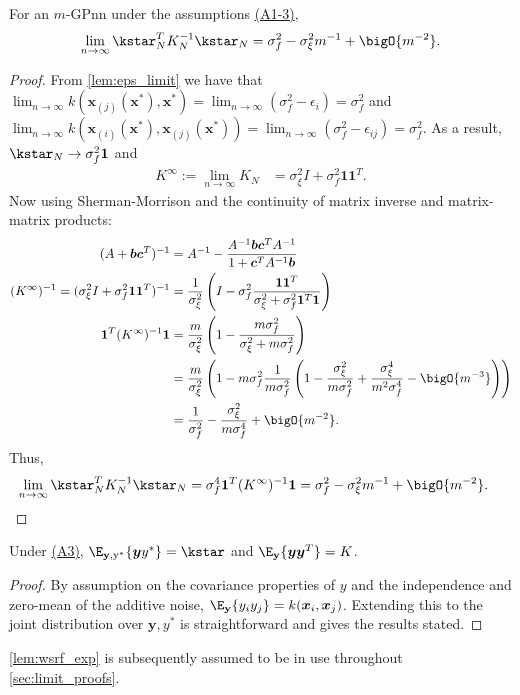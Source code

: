 \begin{lemma}
    \label{lem:gpnn_limit}
    For an \(m\)-GPnn under the assumptions \hyperref[{desc:assumptions_gpnn}]{(A1-3)},
    \[\lim_{n\rightarrow\infty} \kstar_N^TK_N^{-1}\kstar_N = \sigma_f^2-\sigma_\xi^2m^{-1} + \bigO{m^{-2}}.\]
\end{lemma}
\begin{proof}
    From \autoref{lem:eps_limit} we have that 
    \(\lim_{n\rightarrow\infty}k(\mathbf{x}_{(j)}(\bm{x}^*),\bm{x}^*) =
    \lim_{n\rightarrow\infty} (\sigma_f^2 - \epsilon_i) = \sigma_f^2\) and \(\lim_{n\rightarrow\infty} k(\mathbf{x}_{(i)}(\bm{x}^*), \mathbf{x}_{(j)}(\bm{x}^*)) = \lim_{n\rightarrow\infty}(\sigma_f^2 - \epsilon_{ij}) = \sigma_f^2\). 
    As a result, \(\kstar_N\rightarrow \sigma_f^2 \bm{1}\) and 
\begin{align}
    K^\infty:= \lim_{n\rightarrow\infty}K_N & = \sigma_\xi^2 I + \sigma_f^2\bm{11}^T.
\end{align}
Now using Sherman-Morrison and the continuity of matrix inverse and matrix-matrix products:
\begin{align}
    (A + \bm{bc}^T)^{-1} &= A^{-1} - \frac{A^{-1}\bm{bc}^TA^{-1}}{1+\bm{c}^TA^{-1}\bm{b}} \label{eq:sherman-morrison}\\
    (K^\infty)^{-1} = (\sigma_\xi^2I + \sigma_f^2 \bm{11}^T)^{-1} &= \frac{1}{\sigma_\xi^2}\left(I -
    \sigma_f^2\frac{\bm{11}^T}{\sigma_\xi^2 + \sigma_f^2\bm{1}^T\bm{1}}\right) \label{eq:lim_Kinv}\\
    \bm{1}^T(K^\infty)^{-1}\bm{1} &= \frac{m}{\sigma_\xi^2}\left(1 -
    \frac{m\sigma_f^2}{\sigma_\xi^2 + m\sigma_f^2}\right) \nonumber\\
    &= \frac{m}{\sigma_\xi^2}\left(1-m\sigma_f^2\frac{1}{m\sigma_f^2}\left(1-\frac{\sigma_\xi^2}{m\sigma_f^2}
    +\frac{\sigma_\xi^4}{m^2\sigma_f^4}-\bigO{m^{-3}}\right)\right) \nonumber\\
    &= \frac{1}{\sigma_f^2} -\frac{\sigma_\xi^2}{m\sigma_f^4} + \bigO{m^{-2}} \label{eq:Kinf_sum}. 
\end{align}
Thus,
\begin{align}
    \lim_{n\rightarrow\infty}\kstar_N^TK_N^{-1}\kstar_N &=
    \sigma_f^4\bm{1}^T(K^\infty)^{-1}\bm{1} = \sigma_f^2-\sigma_\xi^2m^{-1} + \bigO{m^{-2}}.
\end{align}
\end{proof}

\begin{lemma}\label{lem:wsrf_exp}
    Under \hyperref[ass:gpnn_y]{(A3)}, \(\E_{\mathbf{y},\mathrm{y^*}}\{\bm{y}y^*\} = \kstar\) and \(\E_{\mathbf{y}}\{\bm{yy}^T\} = K\).
\end{lemma}
\begin{proof}
    By assumption on the covariance properties of \(y\) and the independence and zero-mean of the additive noise, \(\E_\mathbf{y}\{y_iy_j\}=k(\bm{x}_i,\bm{x}_j)\). Extending this to the joint distribution over \(\bm{y},y^*\) is straightforward and gives the results stated.
\end{proof}
\autoref{lem:wsrf_exp} is subsequently assumed to be in use throughout \ref{sec:limit_proofs}.

